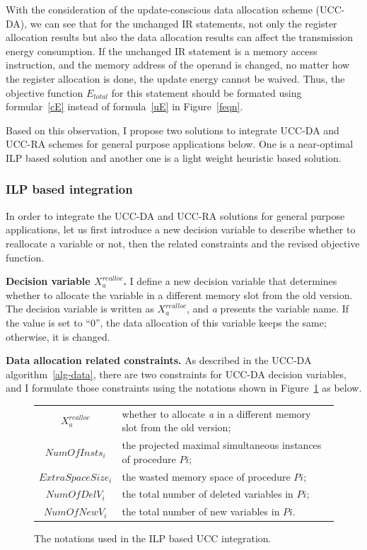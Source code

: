 With the consideration of the update-conscious data allocation scheme (UCC-DA), we can see that
for the unchanged IR statements, not only the register allocation results but also the data allocation 
results can affect the transmission energy consumption. If the unchanged IR statement is a memory access instruction,
and the memory address of the operand is changed, no matter how the register allocation is done, the
update energy cannot be waived. Thus, the objective function $E_{total}$ for this statement should be
formated using formular~\ref{cE} instead of formula~\ref{uE} in Figure~\ref{feqn}.

Based on this observation, I propose two solutions to integrate UCC-DA and UCC-RA schemes for general purpose
applications below. One is a near-optimal ILP based solution and another one is a light weight heuristic based solution.


\subsubsection{ILP based integration}
In order to integrate the UCC-DA and UCC-RA solutions for general purpose applications,
let us first introduce a new decision variable to describe whether to reallocate a variable
or not, then the related constraints and the revised objective function.


\textbf{Decision variable $X_{a}^{realloc}$.}
I define a new decision variable that determines whether to allocate the variable in 
a different memory slot from the old version. 
The decision variable is written as $X_{a}^{realloc}$, and {\it a} presents the
variable name. If the value is set to ``0'', the data allocation of this variable
keeps the same; otherwise, it is changed.


\textbf{Data allocation related constraints.}
As described in the UCC-DA algorithm~\ref{alg-data}, there are two constraints
for UCC-DA decision variables, and I formulate those constraints using the notations
shown in Figure~\ref{notation3} as below.
\begin{figure}[htbp]
\begin{tabular}{c|p{5.0in}} 
$X_{a}^{realloc}$ & whether to allocate {\it a} in a different memory slot from the old version; \\
$NumOfInsts_i$ & the projected maximal simultaneous instances of procedure $Pi$;\\
$ExtraSpaceSize_i$& the wasted memory space of procedure $Pi$;\\
$NumOfDelV_i$ & the total number of deleted variables in $Pi$;\\
$NumOfNewV_i$ & the total number of new variables in $Pi$.\\
\end{tabular}
\caption{The notations used in the ILP based UCC integration.}
\label{notation3}
\end{figure}

